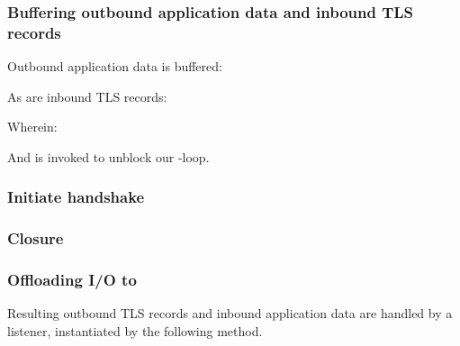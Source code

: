 
\subsubsection*{Buffering outbound application data and inbound TLS records}

Outbound application data is buffered:



\noindent
As are inbound TLS records:



\noindent
Wherein:



\noindent
And  is invoked to unblock our -loop.


\subsubsection*{Initiate handshake}




\subsubsection*{Closure}




\subsubsection*{Offloading I/O to }

Resulting outbound TLS records and inbound application data are handled by a listener, 
instantiated by the following method.

